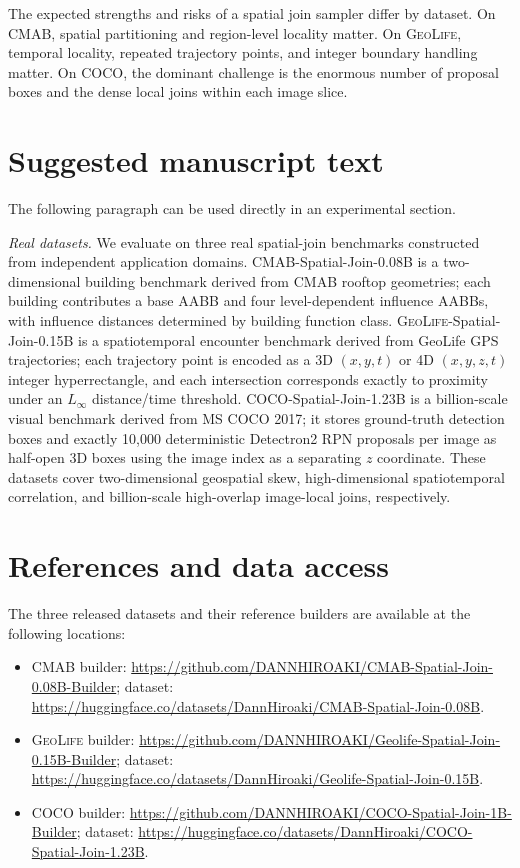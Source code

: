 \documentclass[11pt]{article}
\newcommand{\cmab}{\textsc{CMAB}}
\newcommand{\geolife}{\textsc{GeoLife}}
\newcommand{\coco}{\textsc{COCO}}
\begin{document}
The expected strengths and risks of a spatial join sampler differ by dataset.  On \cmab{}, spatial partitioning and region-level locality matter.  On \geolife{}, temporal locality, repeated trajectory points, and integer boundary handling matter.  On \coco{}, the dominant challenge is the enormous number of proposal boxes and the dense local joins within each image slice.

\section{Suggested manuscript text}
\label{sec:suggested-text}

The following paragraph can be used directly in an experimental section.

\medskip
\noindent
\emph{Real datasets.}
We evaluate on three real spatial-join benchmarks constructed from independent application domains.  \cmab-Spatial-Join-0.08B is a two-dimensional building benchmark derived from CMAB rooftop geometries; each building contributes a base AABB and four level-dependent influence AABBs, with influence distances determined by building function class.  \geolife-Spatial-Join-0.15B is a spatiotemporal encounter benchmark derived from GeoLife GPS trajectories; each trajectory point is encoded as a 3D $(x,y,t)$ or 4D $(x,y,z,t)$ integer hyperrectangle, and each intersection corresponds exactly to proximity under an $L_\infty$ distance/time threshold.  \coco-Spatial-Join-1.23B is a billion-scale visual benchmark derived from MS COCO 2017; it stores ground-truth detection boxes and exactly 10,000 deterministic Detectron2 RPN proposals per image as half-open 3D boxes using the image index as a separating $z$ coordinate.  These datasets cover two-dimensional geospatial skew, high-dimensional spatiotemporal correlation, and billion-scale high-overlap image-local joins, respectively.

\section{References and data access}
\label{sec:references-access}

The three released datasets and their reference builders are available at the following locations:
\begin{itemize}[leftmargin=2em,itemsep=2pt]
  \item \cmab{} builder: \url{https://github.com/DANNHIROAKI/CMAB-Spatial-Join-0.08B-Builder}; dataset: \url{https://huggingface.co/datasets/DannHiroaki/CMAB-Spatial-Join-0.08B}.
  \item \geolife{} builder: \url{https://github.com/DANNHIROAKI/Geolife-Spatial-Join-0.15B-Builder}; dataset: \url{https://huggingface.co/datasets/DannHiroaki/Geolife-Spatial-Join-0.15B}.
  \item \coco{} builder: \url{https://github.com/DANNHIROAKI/COCO-Spatial-Join-1B-Builder}; dataset: \url{https://huggingface.co/datasets/DannHiroaki/COCO-Spatial-Join-1.23B}.
\end{itemize}
\end{document}

